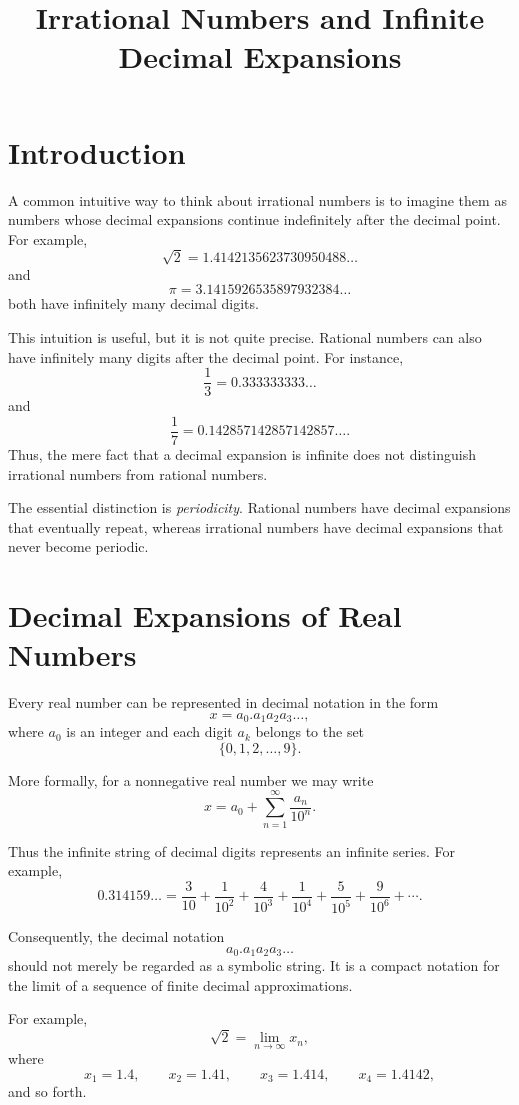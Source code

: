 \documentclass{essay}
\title{Irrational Numbers and Infinite Decimal Expansions}
\author{}
\date{}
\begin{document}
\maketitle

\section{Introduction}

A common intuitive way to think about irrational numbers is to imagine them as numbers whose decimal expansions continue indefinitely after the decimal point. For example,
\[ \sqrt{2} = 1.4142135623730950488\ldots \]
and
\[ \pi = 3.1415926535897932384\ldots \]
both have infinitely many decimal digits.

This intuition is useful, but it is not quite precise. Rational numbers can also have infinitely many digits after the decimal point. For instance,
\[ \frac{1}{3} = 0.333333333\ldots \]
and
\[ \frac{1}{7} = 0.142857142857142857\ldots. \]
Thus, the mere fact that a decimal expansion is infinite does not distinguish irrational numbers from rational numbers.

The essential distinction is \emph{periodicity}. Rational numbers have decimal expansions that eventually repeat, whereas irrational numbers have decimal expansions that never become periodic.

\section{Decimal Expansions of Real Numbers}

Every real number can be represented in decimal notation in the form
\[ x = a_{0}.a_{1}a_{2}a_{3}\ldots, \]
where \(a_{0}\) is an integer and each digit \(a_{k}\) belongs to the set
\[ \{0,1,2,\ldots,9\}. \]

More formally, for a nonnegative real number we may write
\[ x = a_{0} + \sum_{n=1}^{\infty}\frac{a_{n}}{10^{n}}. \]

Thus the infinite string of decimal digits represents an infinite series. For example,
\[ 0.314159\ldots = \frac{3}{10} + \frac{1}{10^{2}} + \frac{4}{10^{3}} + \frac{1}{10^{4}} + \frac{5}{10^{5}} + \frac{9}{10^{6}} +\cdots. \]

Consequently, the decimal notation
\[ a_{0}.a_{1}a_{2}a_{3}\ldots \]
should not merely be regarded as a symbolic string. It is a compact notation for the limit of a sequence of finite decimal approximations.

For example,
\[ \sqrt{2} = \lim_{n\to\infty} x_{n}, \]
where
\[ x_{1}=1.4,\qquad x_{2}=1.41,\qquad x_{3}=1.414,\qquad x_{4}=1.4142, \]
and so forth.
\end{document}
